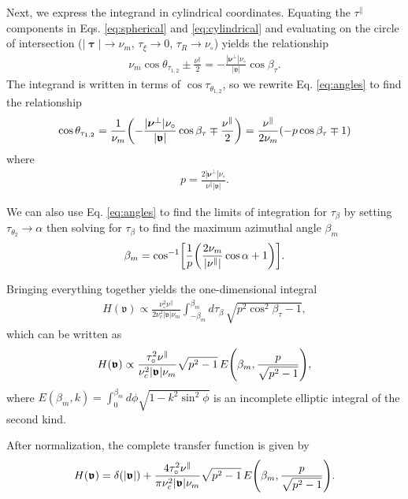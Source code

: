 \documentclass[]{osa-article}
\let\originalleft\left
\let\originalright\right
\renewcommand{\left}{\mathopen{}\mathclose\bgroup\originalleft}
\renewcommand{\right}{\aftergroup\egroup\originalright}
\newcommand{\mypar}{\parallel}
\providecommand{\bs}[1]{\boldsymbol{#1}}
\providecommand{\bv}{\boldsymbol{\mathfrak{v}}}
\providecommand{\bvperp}{\bs{\nu}^{\bot}}
\providecommand{\bvpar}{\nu^{\parallel}}
\providecommand{\bt}{\bs{\uptau}}
\providecommand{\btpar}{\tau^{\mypar}}
\begin{document}
Next, we express the integrand in cylindrical coordinates. Equating the $\btpar$ components in Eqs. \eqref{eq:spherical} and \eqref{eq:cylindrical} and evaluating on the circle of intersection ($|\bt|\rightarrow \nu_m$, $\tau_\xi\rightarrow 0$, $\tau_R\rightarrow \nu_\circ$) yields the relationship
\begin{align}
  \nu_m\cos\theta_{\tau_{1,2}} \pm \frac{\bvpar}{2} = -\frac{|\bvperp|\nu_\circ}{|\bv|}\cos\beta_\tau\label{eq:angles}.
\end{align}
The integrand is written in terms of $\cos\tau_{\theta_{1,2}}$, so we rewrite Eq. \eqref{eq:angles} to find the relationship
\begin{align}
  \cos\theta_{\tau_{1,2}} = \frac{1}{\nu_m}\left(-\frac{|\bvperp|\nu_\circ}{|\bv|}\cos\beta_\tau\mp \frac{\bvpar}{2}\right) = \frac{\bvpar}{2\nu_m}\left(-p\cos\beta_\tau \mp 1\right)
\end{align}
where
\begin{align}
  p = \frac{2|\bvperp|\nu_\circ}{\bvpar|\bv|}.
\end{align}

We can also use Eq. \eqref{eq:angles} to find the limits of integration for $\tau_\beta$ by setting $\tau_{\theta_2} \rightarrow \alpha$ then solving for $\tau_\beta$ to find the maximum azimuthal angle $\beta_m$
\begin{align}
  \beta_m = \cos^{-1}\left[\frac{1}{p}\left(\frac{2\nu_m}{|\bvpar|}\cos\alpha + 1\right)\right].
\end{align}

Bringing everything together yields the one-dimensional integral
\begin{align}
  H(\bv) \propto \frac{\nu_\circ^2\bvpar}{2\nu_c^2|\bv|\nu_m}\int_{-\beta_m}^{\beta_m}d\tau_\beta\, \sqrt{p^2\cos^2\beta_\tau - 1}, 
\end{align}
which can be written as 
\begin{align}
  H(\bv) \propto \frac{\tau_{\circ}^2\bvpar}{\nu_c^2|\bv|\nu_m}\sqrt{p^2 - 1}\,E\left(\beta_m, \frac{p}{\sqrt{p^2 - 1}}\right),
\end{align}
where $E(\beta_m, k)  = \int_0^{\beta_m} d\phi\sqrt{1 - k^2\sin^2\phi}$ is an incomplete elliptic integral of the second kind.

After normalization, the complete transfer function is given by
\begin{align}
  H(\bv) = \delta(|\bv|) + \frac{4\tau_{\circ}^2\bvpar}{\pi\nu_c^2|\bv|\nu_m}\sqrt{p^2 - 1}\,E\left(\beta_m, \frac{p}{\sqrt{p^2 - 1}}\right).
\end{align}
\end{document}
